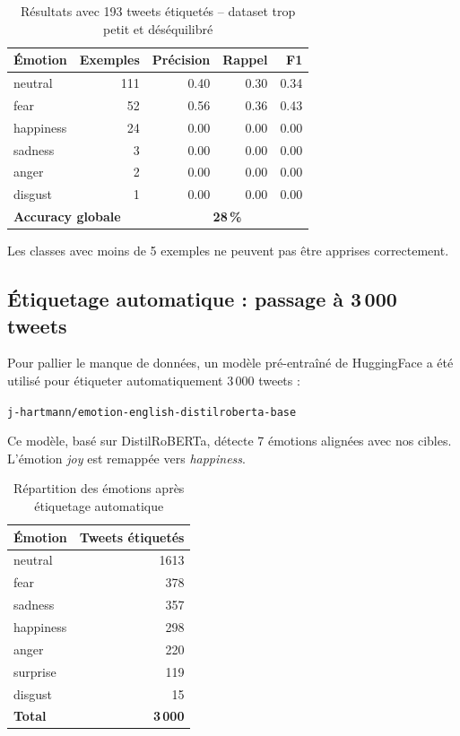 \documentclass[12pt, a4paper]{article}
\begin{document}
\begin{table}[h!]
\centering
\begin{tabular}{lrrrr}
\toprule
\textbf{Émotion} & \textbf{Exemples} & \textbf{Précision} & \textbf{Rappel} & \textbf{F1} \\
\midrule
neutral   & 111 & 0.40 & 0.30 & 0.34 \\
fear      &  52 & 0.56 & 0.36 & 0.43 \\
happiness &  24 & 0.00 & 0.00 & 0.00 \\
sadness   &   3 & 0.00 & 0.00 & 0.00 \\
anger     &   2 & 0.00 & 0.00 & 0.00 \\
disgust   &   1 & 0.00 & 0.00 & 0.00 \\
\midrule
\multicolumn{2}{l}{\textbf{Accuracy globale}} & \multicolumn{3}{c}{\textbf{28\,\%}} \\
\bottomrule
\end{tabular}
\caption{Résultats avec 193 tweets étiquetés -- dataset trop petit et déséquilibré}
\end{table}

Les classes avec moins de 5 exemples ne peuvent pas être apprises correctement.

\subsection{Étiquetage automatique : passage à 3\,000 tweets}

Pour pallier le manque de données, un modèle pré-entraîné de HuggingFace a été utilisé
pour étiqueter automatiquement 3\,000 tweets :

\begin{center}
\texttt{j-hartmann/emotion-english-distilroberta-base}
\end{center}

Ce modèle, basé sur DistilRoBERTa, détecte 7 émotions alignées avec nos cibles.
L'émotion \textit{joy} est remappée vers \textit{happiness}.

\begin{table}[h!]
\centering
\begin{tabular}{lr}
\toprule
\textbf{Émotion} & \textbf{Tweets étiquetés} \\
\midrule
neutral   & 1613 \\
fear      &  378 \\
sadness   &  357 \\
happiness &  298 \\
anger     &  220 \\
surprise  &  119 \\
disgust   &   15 \\
\midrule
\textbf{Total} & \textbf{3\,000} \\
\bottomrule
\end{tabular}
\caption{Répartition des émotions après étiquetage automatique}
\end{table}
\end{document}
